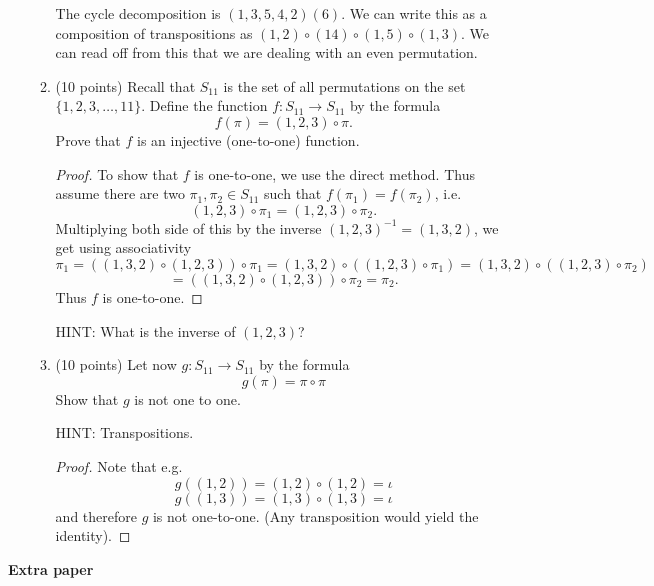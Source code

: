 \documentclass[12pt]{article}
\begin{document}
\begin{enumerate}
\begin{enumerate}
The cycle decomposition is $(1,3,5,4,2)(6)$. We can write this as a composition of transpositions as $(1,2)\circ (1 4) \circ (1,5) \circ (1,3)$. We can read off from this that we are dealing with an even permutation.

\item (10 points) Recall that $S_{11}$ is the set of all permutations on the set $\{1,2,3,\dots,11\}$. Define the function $f:S_{11}\to S_{11}$ by the formula
\[
f(\pi)=(1,2,3)\circ\pi.
\]
Prove that $f$ is an injective (one-to-one) function.

\begin{proof}
To show that $f$ is one-to-one, we use the direct method. Thus assume there are two $\pi_1,\pi_2\in S_{11}$ such that $f(\pi_1)=f(\pi_2)$, i.e.
\[
(1,2,3)\circ\pi_1=(1,2,3)\circ \pi_2.
\]
Multiplying both side of this by the inverse $(1,2,3)^{-1}=(1,3,2)$, we get using associativity
\[
\pi_1=((1,3,2)\circ(1,2,3))\circ\pi_1=(1,3,2)\circ((1,2,3)\circ\pi_1)=(1,3,2)\circ((1,2,3)\circ\pi_2)
\]
\[
=((1,3,2)\circ(1,2,3))\circ\pi_2=\pi_2.
\]
Thus $f$ is one-to-one.
\end{proof}

HINT: What is the inverse of $(1,2,3)$?

\item (10 points) Let now $g:S_{11}\to S_{11}$ by the formula
\[
g(\pi)=\pi\circ\pi
\]
Show that $g$ is not one to one. 

HINT: Transpositions.

\begin{proof}
Note that e.g. 
\[
g((1,2))=(1,2)\circ(1,2)=\iota
\]
\[
g((1,3))=(1,3)\circ (1,3)=\iota
\]
and therefore $g$ is not one-to-one. (Any transposition would yield the identity).
\end{proof}
\end{enumerate}

\end{enumerate}

\newpage
\noindent
\textbf{Extra paper}
%

%
\end{document}

